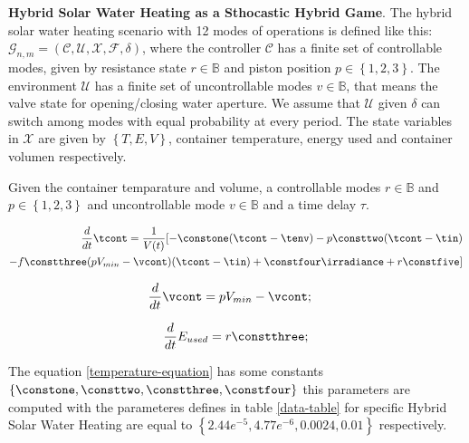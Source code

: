 \clearpage

\textbf{Hybrid Solar Water Heating as a Sthocastic Hybrid Game}.
The hybrid solar water heating scenario with 12 modes of operations is
defined  like this: $\mathcal{G}_{n,m} = (\mathcal{C,U,X,F},\delta)$, 
where the controller $\mathcal{C}$ has a finite set of controllable modes,
given by resistance state ${r \in \mathbb{B}}$ and piston position $p \in 
\left\lbrace1,2,3\right\rbrace $. The environment $\mathcal{U}$ has a finite  
set of uncontrollable modes $v \in \mathbb{B} $, that means the valve state 
for opening/closing water aperture. We assume that $\mathcal{U}$ given
$\delta$ can switch among modes with equal probability at every period. 
The state variables in $\mathcal{X}$ are given by $\left\lbrace
T,E,V \right\rbrace $, container temperature, energy used and container volumen
respectively.

Given the container temparature and volume, a controllable modes $r \in \mathbb{B}$
and $p \in \left\lbrace1,2,3\right\rbrace $ and uncontrollable mode
$v \in \mathbb{B} $ and a time delay $\tau$.

\begin{equation}
    \begin{aligned}
\frac{d}{dt}\tcont = \frac{1}{V(t)} [ -\constone(\tcont-\tenv)
- p \consttwo(\tcont-\tin) \\
- f \constthree(pV_{min} - \vcont)(\tcont-\tin)
+ \constfour\irradiance+ 
r \constfive ]
    \end{aligned}
\label{temperature-equation}
\end{equation}

\begin{equation}
\frac{d}{dt}\vcont = pV_{min} - \vcont; \quad
\label{volume-equation}
\end{equation}

\begin{equation} 
\frac{d}{dt}E_{used} =  r \constthree ;
\label{Energy-equation}
\end{equation}

The equation \ref{temperature-equation} has some constants $\left\lbrace 
\constone, \consttwo, \constthree, \constfour \right\rbrace $ this
parameters are computed with the parameteres defines in table \ref{data-table} for specific Hybrid Solar Water Heating
are equal to $\left\lbrace 2.44e^{-5},  4.77e^{-6}
, 0.0024, 0.01  \right\rbrace$ respectively.

\clearpage

